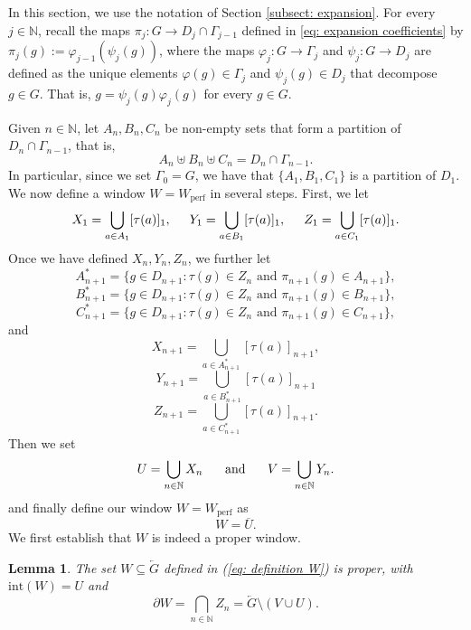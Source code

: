 \documentclass[titlepage,reqno,10pt]{amsart}
\newtheorem{lemma}[theorem]{Lemma}
\theoremstyle{definition}
\begin{document}
In this section, we use the notation of Section \ref{subsect: expansion}.
For every $j\in \mathbb{N}$, recall the maps $\pi_j:G\to D_j\cap \Gamma_{j-1}$ defined in \eqref{eq: expansion coefficients} by $\pi_j(g) := \varphi_{j-1}(\psi_j(g))$, where the maps $\varphi_j:G\to \Gamma_j$ and $\psi_j:G\to D_j$ are defined as the unique elements $\varphi(g)\in\Gamma_j$ and $\psi_j(g)\in D_j$ that decompose $g\in G$.
That is, $g=\psi_j(g)\varphi_j(g)$ for every $g\in G$. \medskip


Given $n\in\mathbb{N}$, let $A_n, B_n, C_n$ be non-empty sets that form a partition of $D_n\cap \Gamma_{n-1}$, that is,  
 $$A_n\uplus B_n \uplus C_n = D_n\cap \Gamma_{n-1}.$$  
In particular, since we set $\Gamma_0=G$, we have that $\{A_1,  B_1, C_1\}$ is a partition of $D_1$.
We now define a window $W=W_\mathrm{perf}$ in several steps. First, we let   
$$
X_1=\bigcup_{a\in A_1}[\tau(a)]_1, \hspace{5mm}  Y_1=\bigcup_{a\in B_1}[\tau(a)]_1, \hspace{5mm} Z_1=\bigcup_{a\in C_1}[\tau(a)]_1.
$$
Once we have defined $X_n, Y_n, Z_n$, we further let 
$$
A_{n+1}^*=\{g\in D_{n+1}: \tau(g)\in Z_n \mbox{ and } {\pi_{n+1}(g)}\in A_{n+1}\}, 
$$
$$
B_{n+1}^*=\{g\in D_{n+1}: \tau(g)\in Z_n \mbox{ and } {\pi_{n+1}(g)}\in B_{n+1}\}, 
$$ 
$$
C_{n+1}^*=\{g\in D_{n+1}: \tau(g)\in Z_n \mbox{ and } {\pi_{n+1}(g)}\in C_{n+1}\}, 
$$
and 
$$
X_{n+1}=\bigcup_{a\in A_{n+1}^*}[\tau(a)]_{n+1},$$
$$Y_{n+1}=\bigcup_{a\in B_{n+1}^*}[\tau(a)]_{n+1}$$
$$Z_{n+1}=\bigcup_{a\in C_{n+1}^*}[\tau(a)]_{n+1}.
$$
Then we set
$$
U=\bigcup_{n\in\mathbb{N}}X_n  \hspace{5mm} \mbox{ and } \hspace{5mm} V=\bigcup_{n\in\mathbb{N}}Y_n.
$$
and finally define our window $W=W_\mathrm{perf}$ as 
\begin{equation}
    \label{eq: definition W}
    W = \overline{U}.
\end{equation}
We first establish that $W$ is indeed a proper window. 
\begin{lemma}\label{lem: alternative chara W and partial W}
The set $W\subseteq \overleftarrow{G}$ defined in (\ref{eq: definition W}) is proper, with $\mathrm{int}(W)=U$ and 
 \begin{equation}\label{eq: boundary characterisation}
 \partial W=\bigcap_{n\in\mathbb{N}}Z_n=\overleftarrow{G}\setminus (V\cup U).
 \end{equation}
\end{lemma}
\end{document}
